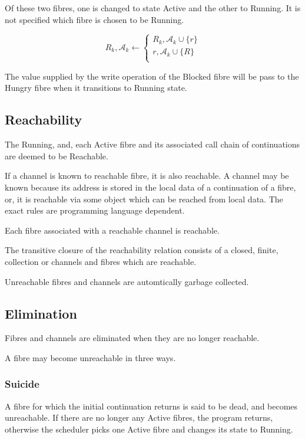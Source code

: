 \documentclass[oneside]{book}
\begin{document}
\begin{enumerate}
Of these two
fibres, one is changed to state Active and the other to Running.
It is not specified which fibre is chosen to be Running.

\begin{equation}
R_k,{\mathcal A_k} \leftarrow
\begin{cases}
R_k,{\mathcal A_k} \cup \{r\} \\
r,{\mathcal A_k} \cup \{R\} \\
\end{cases}
\end{equation}


The value supplied by the write operation of the Blocked
fibre will be pass to the Hungry fibre when it transitions
to Running state.
\end{enumerate}

\subsection{Reachability}
The Running, and, each Active fibre and its associated call chain of 
continuations are deemed to be Reachable.

If a channel is known to reachable fibre, it is also reachable.
A channel may be known because its address is stored in the local
data of a continuation of a fibre, or, it is reachable via some object
which can be reached from local data. The exact rules are 
programming language dependent.

Each fibre associated with a reachable channel is reachable.

The transitive closure of the reachability relation consists
of a closed, finite, collection or channels and fibres which
are reachable.

Unreachable fibres and channels are automtically garbage
collected.

\subsection{Elimination}
Fibres and channels are eliminated when they are 
no longer reachable.

A fibre may become unreachable in three ways.

\subsubsection{Suicide}
A fibre for which the initial continuation returns is said to be
dead, and  becomes unreachable. If there are no longer any Active fibres,
the program returns, otherwise the scheduler picks
one Active fibre and changes its state to Running.
\end{document}
